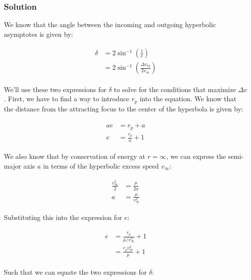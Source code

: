 \documentclass[
]{article}
\begin{document}
\subsubsection{Solution}\label{solution-1}

We know that the angle between the incoming and outgoing hyperbolic
asymptotes is given by:

\[\begin{aligned}
\begin{aligned}
    \delta &= 2 \sin^{-1} \left( \frac{1}{e} \right) \\
    &= 2 \sin^{-1} \left( \frac{\Delta v_{eq}}{2 v_\infty} \right)
\end{aligned}
\end{aligned}\]

We'll use these two expressions for \(\delta\) to solve for the
conditions that maximize \(\Delta v\). First, we have to find a way to
introduce \(r_p\) into the equation. We know that the distance from the
attracting focus to the center of the hyperbola is given by:

\[\begin{aligned}
\begin{aligned}
    ae &= r_p + a \\
    e &= \frac{r_p}{a} + 1
\end{aligned}
\end{aligned}\]

We also know that by conservation of energy at \(r=\infty\), we can
express the semi-major axis \(a\) in terms of the hyperbolic excess
speed \(v_\infty\):

\[\begin{aligned}
\begin{aligned}
    \frac{v_\infty^2}{2} &= \frac{\mu}{2a} \\
    a &= \frac{\mu}{v_\infty^2}
\end{aligned}
\end{aligned}\]

Substituting this into the expression for \(e\):

\[\begin{aligned}
\begin{aligned}
    e &= \frac{r_p}{\mu/v_\infty^2} + 1 \\
    &= \frac{r_p v_\infty^2}{\mu} + 1
\end{aligned}
\end{aligned}\]

Such that we can equate the two expressions for \(\delta\):
\end{document}
